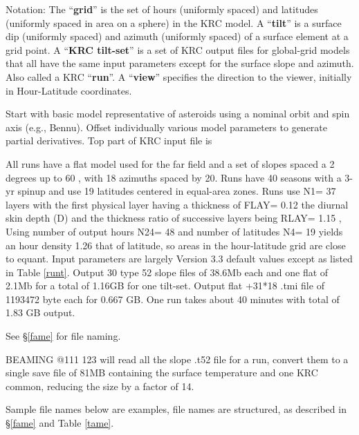 \documentclass{article}
\begin{document}
Notation:
\qi The ``\textbf{grid}''  is the set of hours (uniformly spaced) and latitudes (uniformly spaced in area on a sphere) in the KRC model.
\qi A ``\textbf{tilt}'' is a surface dip (uniformly spaced) and azimuth (uniformly spaced) of a surface element at a grid point.
\qi A ``\textbf{KRC tilt-set}'' is a set of KRC output files for global-grid models that all have the same input parameters except for the surface slope and azimuth. Also called a KRC  ``\textbf{run}''.
\qi A ``\textbf{view}'' specifies the direction to the viewer, initially in Hour-Latitude coordinates.

Start with basic model representative of asteroids using a nominal orbit and
spin axis (e.g., Bennu). Offset individually various model parameters to
generate partial derivatives. Top part of KRC input file is

All runs have a flat model used for the far field and a set of slopes spaced a 2
degrees up to 60 \qd, with 18 azimuths spaced by 20\qd. Runs have 40 seasons
with a 3-yr spinup and use 19 latitudes centered in equal-area zones. Runs use
N1= 37 layers with the first physical layer having a thickness of FLAY= 0.12 the
diurnal skin depth (D) and the thickness ratio of successive layers being RLAY=
1.15 , Using number of output hours N24= 48 and number of latitudes N4= 19
yields an hour density 1.26 that of latitude, so areas in the hour-latitude grid
are close to equant.  Input parameters are largely Version 3.3 default values
except as listed in Table \ref{runt}. Output 30 type 52 slope files of 38.6Mb
each and one flat of 2.1Mb for a total of 1.16GB for one tilt-set.  Output flat
+31*18 .tmi file of 1193472 byte each for 0.667 GB.  One run takes about 40
minutes with total of 1.83 GB output.

See \S \ref{fame} for file naming.

BEAMING @111 123 will read all the slope .t52 file for a run, convert them to a
single save file of 81MB containing the surface temperature and one KRC common,
reducing the size by a factor of 14. 

Sample file names below are examples, file names are structured, as described in
\S \ref{fame} and Table \ref{tame}.
\end{document}
